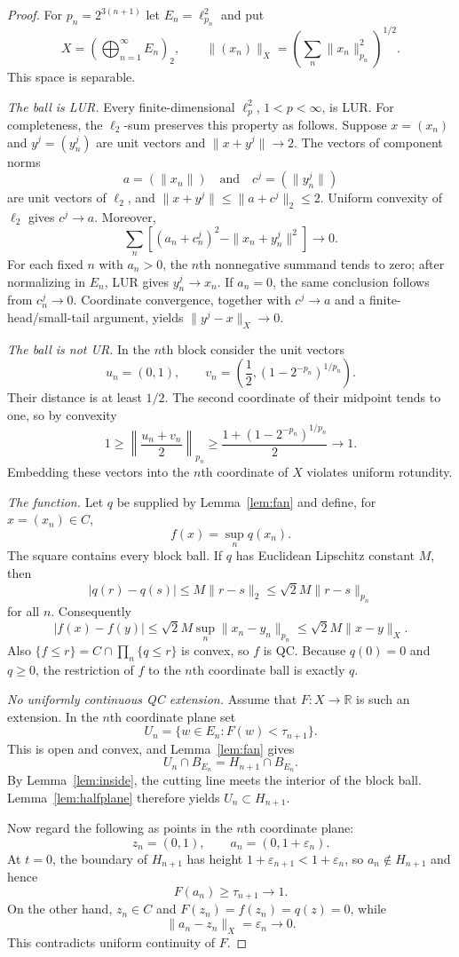 \documentclass[11pt]{article}
\newcommand{\R}{\mathbb R}
\newcommand{\eps}{\varepsilon}
\begin{document}
\begin{proof}
For $p_n=2^{3(n+1)}$ let $E_n=\ell_{p_n}^2$ and put
\[
 X=\left(\bigoplus_{n=1}^{\infty}E_n\right)_{\!2},
 \qquad
 \|(x_n)\|_X=\left(\sum_n\|x_n\|_{p_n}^2\right)^{1/2}.
\]
This space is separable.

\smallskip\noindent
\emph{The ball is LUR.}
Every finite-dimensional $\ell_p^2$, $1<p<\infty$, is LUR.  For
completeness, the $\ell_2$-sum preserves this property as follows.  Suppose
$x=(x_n)$ and $y^j=(y_n^j)$ are unit vectors and $\|x+y^j\|\to2$.  The
vectors of component norms
\[
 a=(\|x_n\|)\quad\text{and}\quad
 c^j=(\|y_n^j\|)
\]
are unit vectors of $\ell_2$, and
$\|x+y^j\|\le\|a+c^j\|_2\le2$.  Uniform convexity of $\ell_2$ gives
$c^j\to a$.  Moreover,
\[
 \sum_n\left[(a_n+c_n^j)^2-\|x_n+y_n^j\|^2\right]\longrightarrow0.
\]
For each fixed $n$ with $a_n>0$, the $n$th nonnegative summand tends to
zero; after normalizing in $E_n$, LUR gives $y_n^j\to x_n$.  If $a_n=0$,
the same conclusion follows from $c_n^j\to0$.  Coordinate convergence,
together with $c^j\to a$ and a finite-head/small-tail argument, yields
$\|y^j-x\|_X\to0$.

\smallskip\noindent
\emph{The ball is not UR.}
In the $n$th block consider the unit vectors
\[
 u_n=(0,1),\qquad
 v_n=\left(\frac12,(1-2^{-p_n})^{1/p_n}\right).
\]
Their distance is at least $1/2$.  The second coordinate of their midpoint
tends to one, so by convexity
\[
 1\ge\left\|\frac{u_n+v_n}{2}\right\|_{p_n}
 \ge \frac{1+(1-2^{-p_n})^{1/p_n}}2\longrightarrow1.
\]
Embedding these vectors into the $n$th coordinate of $X$ violates uniform
rotundity.

\smallskip\noindent
\emph{The function.}
Let $q$ be supplied by Lemma~\ref{lem:fan} and define, for $x=(x_n)\in C$,
\[
 f(x)=\sup_n q(x_n).
\]
The square contains every block ball.  If $q$ has Euclidean Lipschitz
constant $M$, then
\[
 |q(r)-q(s)|\le M\|r-s\|_2
 \le \sqrt2M\|r-s\|_{p_n}
\]
for all $n$.  Consequently
\[
 |f(x)-f(y)|\le\sqrt2M\sup_n\|x_n-y_n\|_{p_n}
 \le\sqrt2M\|x-y\|_X.
\]
Also $\{f\le r\}=C\cap\prod_n\{q\le r\}$ is convex, so $f$ is QC.
Because $q(0)=0$ and $q\ge0$, the restriction of $f$ to the $n$th
coordinate ball is exactly $q$.

\smallskip\noindent
\emph{No uniformly continuous QC extension.}
Assume that $F:X\to\R$ is such an extension.  In the $n$th coordinate
plane set
\[
 U_n=\{w\in E_n:F(w)<\tau_{n+1}\}.
\]
This is open and convex, and Lemma~\ref{lem:fan} gives
\[
 U_n\cap B_{E_n}=H_{n+1}\cap B_{E_n}.
\]
By Lemma~\ref{lem:inside}, the cutting line meets the interior of the block
ball.  Lemma~\ref{lem:halfplane} therefore yields $U_n\subset H_{n+1}$.

Now regard the following as points in the $n$th coordinate plane:
\[
 z_n=(0,1),\qquad a_n=(0,1+\eps_n).
\]
At $t=0$, the boundary of $H_{n+1}$ has height
$1+\eps_{n+1}<1+\eps_n$, so $a_n\notin H_{n+1}$ and hence
\[
 F(a_n)\ge\tau_{n+1}\longrightarrow1.
\]
On the other hand, $z_n\in C$ and
$F(z_n)=f(z_n)=q(z)=0$, while
\[
 \|a_n-z_n\|_X=\eps_n\longrightarrow0.
\]
This contradicts uniform continuity of $F$.
\end{proof}
\end{document}
